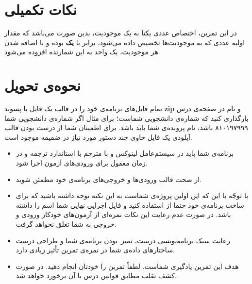 \documentclass{utap}
\begin{document}
	\linespread{1.6}
	\begin{latin}%
		\centering
		\begin{minipage}[t]{1\textwidth}
			{}
			{}
		\end{minipage}%
	\end{latin}
	
	\section{نکات تکمیلی}
	\hspace{5mm}
	در این تمرین، اختصاص عددی یکتا به یک موجودیت‌،‌ بدین صورت می‌باشد که مقدار اولیه عددی که به موجودیت‌ها تخصیص داده می‌شود، برابر با \textbf{یک} بوده و با اضافه شدن هر موجودیت، یک واحد به این شمارنده افزوده می‌شود.
	
	\section{نحوه‌ی تحویل}
	\hspace{5mm}
	تمام فایل‌های برنامه‌ی خود را در قالب یک فایل با پسوند \textbf{zip} و نام  در صفحه‌ی  درس بارگذاری کنید که  شماره‌ی دانشجویی شماست؛ برای مثال اگر شماره‌ی دانشجویی شما ۸۱۰۱۹۷۹۹۹ باشد، نام پرونده‌ی شما باید  باشد. برای اطمینان شما از درست بودن قالب آپلودی یک فایل حاوی چند دستور مورد نیاز در ضمیمه موجود است.
	\begin{itemize}
		\item برنامه‌ی شما باید در سیستم‌عامل لینوکس و با مترجم  با استاندارد  ترجمه و در زمان معقول برای ورودی‌های آزمون اجرا شود.
		\item از صحت قالب ورودی‌ها و خروجی‌های برنامه‌ی خود مطمئن شوید.
		\item با توجّه با این که این اولین پروژه‌ی  شماست به این نکته توجه داشته باشید که برای ساخت برنامه‌ی خود حتما از  استفاده کنید و فایل اجرایی نهایی شما اسم  را داشته باشد. در صورت عدم رعایت این نکات نمره‌ای از آزمون‌های خودکار ورودی و خروجی به شما تعلق نخواهد گرفت.
		\item رعایت سبک برنامه‌نویسی درست، تمیز~بودن برنامه‌ی شما و طراحی درست ساختار‌های داده‌ی شما در نمره‌ی تمرین تأثیر زیادی دارد.
		\item هدف این تمرین یادگیری شماست. لطفاً تمرین را خودتان انجام دهید. در صورت کشف تقلب مطابق قوانین درس با آن برخورد خواهد شد.
	\end{itemize}
	
	
\end{document}
